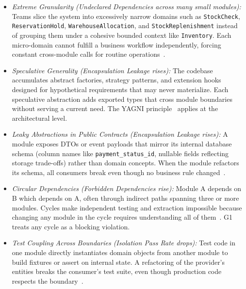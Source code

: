 \begin{itemize}[itemsep=8pt,topsep=2pt]
  \item \emph{Extreme Granularity (Undeclared Dependencies across many small modules):}
  Teams slice the system into excessively narrow domains such as \texttt{StockCheck}, \texttt{ReservationHold}, \texttt{WarehouseAllocation}, and \texttt{StockReplenishment} instead of grouping them under a cohesive bounded context like \texttt{Inventory}. Each micro-domain cannot fulfill a business workflow independently, forcing constant cross-module calls for routine operations~\cite{dragoni2017microservices,evans2003ddd}.

  \item \emph{Speculative Generality (Encapsulation Leakage rises):}
  The codebase accumulates abstract factories, strategy patterns, and extension hooks designed for hypothetical requirements that may never materialize. Each speculative abstraction adds exported types that cross module boundaries without serving a current need. The YAGNI principle~\cite{extremeProgramming} applies at the architectural level.

  \item \emph{Leaky Abstractions in Public Contracts (Encapsulation Leakage rises):}
  A module exposes DTOs or event payloads that mirror its internal database schema (column names like \texttt{payment\_status\_id}, nullable fields reflecting storage trade-offs) rather than domain concepts. When the module refactors its schema, all consumers break even though no business rule changed~\cite{fowler2002patterns,evans2003ddd}.

  \item \emph{Circular Dependencies (Forbidden Dependencies rise):}
  Module A depends on B which depends on A, often through indirect paths spanning three or more modules. Cycles make independent testing and extraction impossible because changing any module in the cycle requires understanding all of them~\cite{martin2012clean,yourdon1979structured,khononov2024balancing}. G1 treats any cycle as a blocking violation.

  \item \emph{Test Coupling Across Boundaries (Isolation Pass Rate drops):}
  Test code in one module directly instantiates domain objects from another module to build fixtures or assert on internal state. A refactoring of the provider's entities breaks the consumer's test suite, even though production code respects the boundary~\cite{fairbanks2010justenough}.
\end{itemize}

